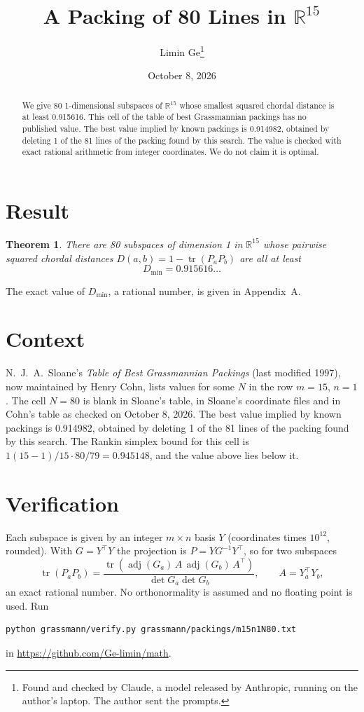 \documentclass[11pt,a4paper]{article}
\title{A Packing of 80 Lines in $\mathbb{R}^{15}$}
\author{Limin Ge\thanks{Found and checked by Claude, a model released by Anthropic, running on the author's laptop. The author sent the prompts.}}
\date{October 8, 2026}
\newtheorem*{theorem}{Theorem}
\begin{document}
\maketitle
\begin{abstract}
We give 80 1-dimensional subspaces of $\mathbb{R}^{15}$ whose smallest squared chordal distance is at least 0.915616. This cell of the table of best Grassmannian packings has no published value. The best value implied by known packings is 0.914982, obtained by deleting 1 of the 81 lines of the packing found by this search. The value is checked with exact rational arithmetic from integer coordinates. We do not claim it is optimal.
\end{abstract}

\section{Result}
\begin{theorem}
There are 80 subspaces of dimension 1 in $\mathbb{R}^{15}$ whose pairwise squared chordal distances $D(a,b) = 1 - \operatorname{tr}(P_aP_b)$ are all at least
\[ D_{\min} = 0.915616\ldots \]
\end{theorem}
The exact value of $D_{\min}$, a rational number, is given in Appendix~A.


\section{Context}
N.~J.~A.~Sloane's \emph{Table of Best Grassmannian Packings} (last modified 1997), now maintained by Henry Cohn, lists values for some $N$ in the row $m=15$, $n=1$. The cell $N=80$ is blank in Sloane's table, in Sloane's coordinate files and in Cohn's table as checked on October 8, 2026. The best value implied by known packings is 0.914982, obtained by deleting 1 of the 81 lines of the packing found by this search. The Rankin simplex bound for this cell is $1(15-1)/15\cdot 80/79 = 0.945148$, and the value above lies below it.


\section{Verification}
Each subspace is given by an integer $m\times n$ basis $Y$ (coordinates times $10^{12}$, rounded). With $G=Y^\top Y$ the projection is $P=YG^{-1}Y^\top$, so for two subspaces
\[ \operatorname{tr}(P_aP_b)=\frac{\operatorname{tr}(\operatorname{adj}(G_a)\,A\,\operatorname{adj}(G_b)\,A^\top)}{\det G_a\det G_b},\qquad A=Y_a^\top Y_b, \]
an exact rational number. No orthonormality is assumed and no floating point is used. Run
\begin{verbatim}
python grassmann/verify.py grassmann/packings/m15n1N80.txt
\end{verbatim}
in \url{https://github.com/Ge-limin/math}.
\end{document}
